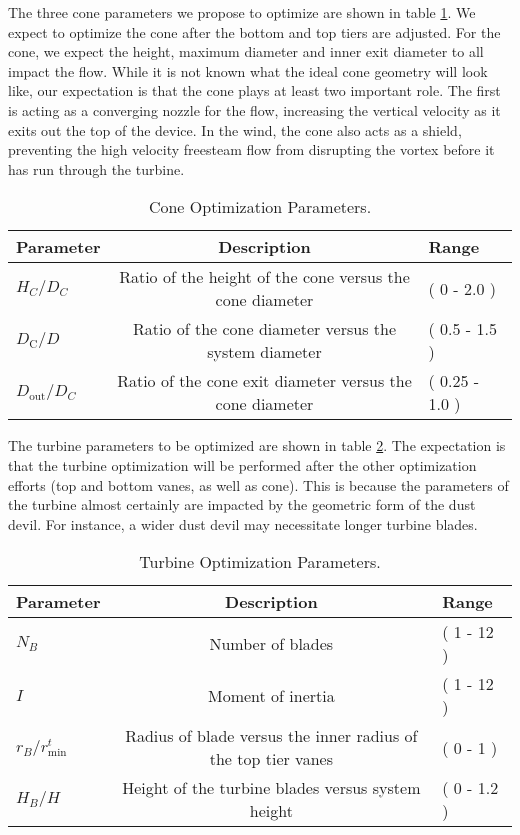 The three cone parameters we propose to optimize are shown in table \ref{tab:cone}. 
We expect to optimize the cone after the bottom and top tiers are adjusted. 
For the cone, we expect the height, maximum diameter and inner exit diameter to 
all impact the flow. While it is not known what the ideal cone geometry will look like, 
our expectation is that the cone plays at least two important role. The first is acting
as a converging nozzle for the flow, increasing the vertical velocity as it exits 
out the top of the device. In the wind, the cone also acts as a shield, preventing
the high velocity freesteam flow from disrupting the vortex before it has run through the 
turbine. 

%
%
\large
\begin{center}
\begin{table}[h]
 \centering
  \begin{tabular}{| l | c | l |}
    \hline
    Parameter & Description & Range \\
    \hline
    $H_C/D_C$ & Ratio of the height of the cone versus the cone diameter & ( 0 - 2.0 ) \\
    $D_{\text{C}}/D$ & Ratio of the cone diameter versus the system
       diameter & ( 0.5 - 1.5 ) \\
    $D_{\text{out}}/D_C$ & Ratio of the cone exit diameter versus the
       cone diameter & ( 0.25 - 1.0 ) \\ 
    \hline
  \end{tabular}
  \caption{Cone Optimization Parameters.}
  \label{tab:cone}
\end{table}
\end{center}
\normalsize

The turbine parameters to be optimized are shown in table \ref{tab:turbine}. 
The expectation is that the turbine optimization will be performed after the other
optimization efforts (top and bottom vanes, as well as cone). This is because the parameters 
of the turbine almost certainly are impacted by the geometric form of the dust devil. 
For instance, a wider dust devil may necessitate longer turbine blades. 

%
%
\large
\begin{center}
\begin{table}[h]
 \centering
  \begin{tabular}{| l | c | l |}
    \hline
    Parameter & Description & Range \\
    \hline
    $N_B$ & Number of blades & ( 1 - 12 ) \\
    $I$ & Moment of inertia & ( 1 - 12 ) \\
    $r_B/r_{\text{min}}^t$ & Radius of blade versus the inner radius of
       the top tier vanes & ( 0 - 1 ) \\
   $H_B/H$ & Height of the turbine blades versus system height & ( 0 - 1.2 ) \\
    \hline
  \end{tabular}
  \caption{Turbine Optimization Parameters.}
  \label{tab:turbine}
\end{table}
\end{center}
\normalsize


